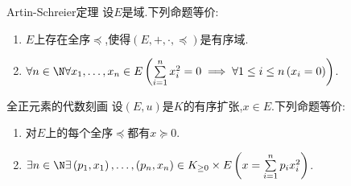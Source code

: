 \begin{corollary}{Artin-Schreier定理}{}
	设$E$是域.下列命题等价:
	\begin{enumerate}
		\item $E$上存在全序$\preccurlyeq$,使得$\left(E,+,\cdot,\preccurlyeq\right)$是有序域.
		\item $\forall n\in\N\forall x_{1},\ldots,x_{n}\in E\left(\sum\limits_{i=1}^{n}x_{i}^{2}=0\implies\forall 1\leq i\leq n\left(x_{i}=0\right)\right)$.
	\end{enumerate}
\end{corollary}

\begin{corollary}{全正元素的代数刻画}{}
	设$\left(E,u\right)$是$K$的有序扩张,$x\in E$.下列命题等价:
	\begin{enumerate}
		\item 对$E$上的每个全序$\preccurlyeq$都有$x\succcurlyeq 0$.
		\item $\exists n\in\N\exists\left(p_{1},x_{1}\right),\ldots,\left(p_{n},x_{n}\right)\in K_{\geq 0}\times E\left(x=\sum\limits_{i=1}^{n}p_{i}x_{i}^{2}\right)$.
	\end{enumerate}
\end{corollary}